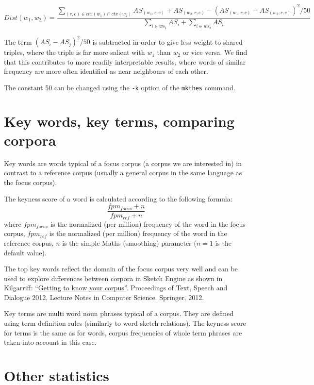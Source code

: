 \documentclass{article}
\begin{document}
$$Dist (w_1, w_2) = \frac{\sum_{(r, c) \in ctx(w_1) \cap ctx(w_2)} AS_{(w_1, r, c)} + AS_{(w_2, r, c)} - (AS_{(w_1, r, c)} - AS_{(w_2, r, c)})^2/50}
 {\sum_{i \in ws_1} AS_i + \sum_{i \in ws_2} AS_i}$$

The term $(AS_i - AS_j)^2/50$ is subtracted in order to give less weight to shared triples, where the triple is far more salient with $w_1$ than $w_2$ or vice versa.  We find that this contributes to more readily interpretable results, where words of similar frequency are more often identified as near neighbours of each other.

The constant 50 can be changed using the \texttt{-k} option of the
\texttt{mkthes} command.


\section{Key words, key terms, comparing corpora}

Key words are words typical of a focus corpus (a corpus we are interested in) in contrast to a reference corpus (usually a general corpus in the same language as the focus corpus).

The keyness score of a word is calculated according to the following formula: $$\frac{fpm_{focus} + n}{fpm_{ref} + n}$$ where $fpm_{focus}$ is the normalized (per million) frequency of the word in the focus corpus, $fpm_{ref}$ is the normalized (per million) frequency of the word in the reference corpus, $n$ is the simple Maths (smoothing) parameter ($n = 1$ is the default value).\vspace{2mm}

The top key words reflect the domain of the focus corpus very well and can be used to explore differences between corpora in Sketch Engine as shown in Kilgarriff: \href{http://trac.sketchengine.co.uk/attachment/wiki/AK/Papers/Kilgarriff\_TSD2012.pdf?format=raw}{``Getting to know your corpus''}. Proceedings of Text, Speech and Dialogue 2012, Lecture Notes in Computer Science. Springer, 2012.\vspace{2mm}

Key terms are multi word noun phrases typical of a corpus. They are defined using term definition rules (similarly to word sketch relations). The keyness score for terms is the same as for words, corpus frequencies of whole term phrases are taken into account in this case.


\section{Other statistics}
\end{document}
